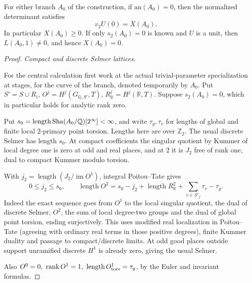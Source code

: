 \begin{lemma}\label{lem:positive-determinant:rank-zero}
For either branch \(A_0\) of the construction, if \(\mathrm{an}(A_0)=0\),
then the normalized determinant satisfies
\[
                         v_2 U(0)=X(A_0) .                           \tag{L5}\label{eq:L5}
\]
In particular \(X(A_0)\ge0\).
If only \(s_2(A_0)=0\) is known and \(U\) is a unit, then
\(L(A_0,1)\ne0\), and hence \(X(A_0)=0\).
\end{lemma}
\begin{proof}
\emph{Compact and discrete Selmer lattices.}

For the central calculation first work at the actual trivial-parameter specialization at stages, for the curve of the branch, denoted temporarily by \(A_0\). Put \(S'=S\cup R_i\), \(O^j=H^j(G_{\mathbb Q,S'},T)\), \(R^j_\mathbb R=H^j(\mathbb R,T)\). Suppose \(s_2(A_0)=0\), which in particular holds for analytic rank zero. 

Put \(s_0=\operatorname{length}\operatorname{Sha}(A_0/\mathbb Q)[2^\infty]<\infty\), and write \(\tau_g,\tau_v\) for lengths of global and finite local \(2\)-primary point torsion. Lengths here are over \(\mathbb Z_2\). The usual discrete Selmer has length \(s_0\). At compact coefficients the singular quotient by Kummer of local degree one is zero at odd and real places, and at 2 it is \(J_2\) free of rank one, dual to compact Kummer modulo torsion. 

With \(j_2=\operatorname{length}(J_2/\operatorname{im}O^1)\), integral Poitou--Tate gives
\[
       0\le j_2\le s_0,\qquad
       \operatorname{length}O^2
             =s_0-j_2+\operatorname{length} R^2_\mathbb R
                        +\sum_{v\in S'_f}\tau_v-\tau_g .
\]
Indeed the exact sequence goes from \(O^1\) to the local singular quotient, the dual of discrete Selmer, \(O^2\), the sum of local degree-two groups and the dual of global point torsion, ending surjectively. This uses modified real localization in Poitou--Tate (agreeing with ordinary real terms in those positive degrees), finite Kummer duality and passage to compact/discrete limits. At odd good places outside support unramified discrete \(H^1\) is already zero, giving the usual Selmer. 

Also \(O^0=0,\ \operatorname{rank}O^1=1,\ \operatorname{length}O^1_{\rm tors}=\tau_g\), by the Euler and invariant formulas.


\end{proof}
